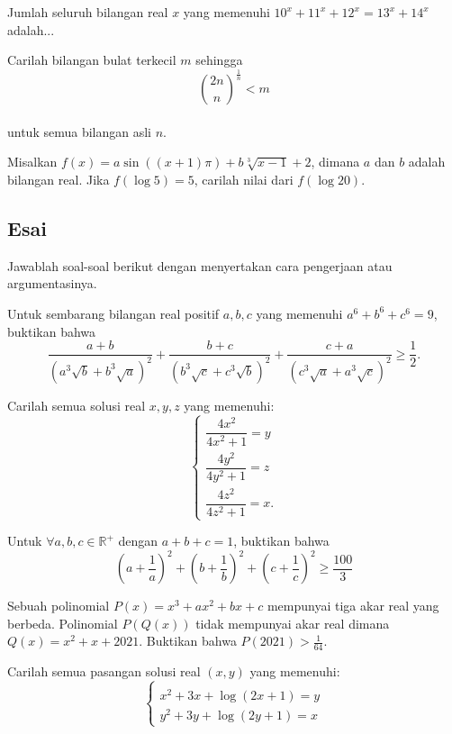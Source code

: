 \documentclass[11pt]{scrartcl}
\begin{document}
	\begin{soalbaru}
		Jumlah seluruh bilangan real $x$ yang memenuhi $10^x+11^x+12^x=13^x+14^x$ adalah... %
	\end{soalbaru}

	\begin{soalbaru}
		Carilah bilangan bulat terkecil $m$ sehingga\\[-15pt] $${2n \choose n}^{\frac{1}{n}}<m$$\\[-20pt] untuk semua bilangan asli $n$.%
	\end{soalbaru}
	
	\begin{soalbaru}
		Misalkan $f(x)=a\sin((x+1)\pi) + b\sqrt[3]{x-1}+2$, dimana $a$ dan $b$ adalah bilangan real. Jika $f(\log 5)=5$, carilah nilai dari $f(\log 20)$.
	\end{soalbaru}

\subsection{Esai}
Jawablah soal-soal berikut dengan menyertakan cara pengerjaan atau argumentasinya.
	
	
	\begin{soalbaru} Untuk sembarang bilangan real positif $a,b,c$ yang memenuhi $a^6+b^6+c^6=9$, buktikan bahwa $$\dfrac{a+b}{(a^3\sqrt{b}+b^3\sqrt{a})^2}+\dfrac{b+c}{(b^3\sqrt{c}+c^3\sqrt{b})^2}+\dfrac{c+a}{(c^3\sqrt{a}+a^3\sqrt{c})^2} \ge \dfrac{1}{2}.$$
		\end{soalbaru}
	
	
	\begin{soalbaru} 
		 Carilah semua solusi real  $x,y,z$ yang memenuhi: 
		 		$$\begin{cases}
		 		\dfrac{4x^2}{4x^2+1}=y \\[5pt]
		 		\dfrac{4y^2}{4y^2+1}=z \\[5pt]
		 		\dfrac{4z^2}{4z^2+1}=x.
		 		\end{cases}$$
	\end{soalbaru}
	
	\begin{soalbaru} 
		 Untuk $\forall a,b,c \in\mathbb{R^+}$ dengan $a+b+c=1$, buktikan bahwa $$\left( a+\frac{1}{a} \right)^2+\left( b+\frac{1}{b} \right)^2+\left( c+\frac{1}{c} \right)^2 \ge \frac{100}{3}$$
	\end{soalbaru}
	
	\begin{soalbaru}
		Sebuah polinomial $P(x)=x^3+ax^2+bx+c$ mempunyai tiga akar real yang berbeda. Polinomial $P(Q(x))$ tidak mempunyai akar real dimana $Q(x)=x^2+x+2021$. Buktikan bahwa $P(2021)>\frac{1}{64}$.
	\end{soalbaru}
	
	\begin{soalbaru}
		Carilah semua pasangan solusi real $(x,y)$ yang memenuhi:\\[-10pt] 
				 		$$\begin{cases}\\[-30pt]
				 		x^2+3x+\log(2x+1)=y \\[-5pt]
				 		y^2+3y+\log(2y+1)=x
				 		\end{cases}$$
	\end{soalbaru}
	
\end{document}

